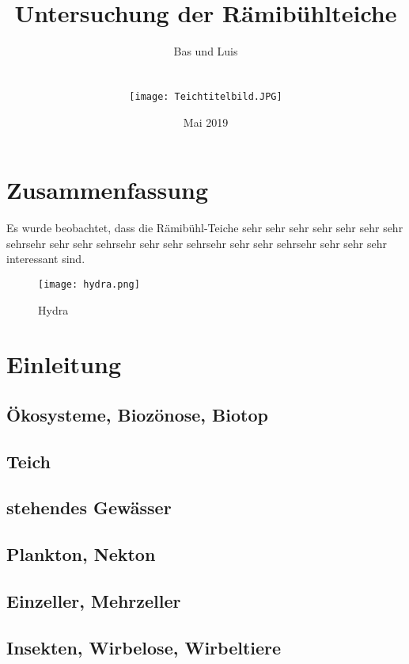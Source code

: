 \documentclass{article}
\title{\Huge{Untersuchung der Rämibühlteiche}}
\author{ \huge{Bas und Luis} \\ \\ \\
         \texttt{[image: Teichtitelbild.JPG]}}
\date{Mai 2019}
\begin{document}
\maketitle

\newpage


\centering \section{Zusammenfassung}
Es wurde beobachtet, dass die Rämibühl-Teiche sehr sehr sehr sehr sehr sehr sehr sehrsehr sehr sehr sehrsehr sehr sehr sehrsehr sehr sehr sehrsehr sehr sehr sehr interessant sind.

\begin{figure}[h!]
\centering
\texttt{[image: hydra.png]}
\caption{Hydra}
\label{fig:universe}
\end{figure}

\section{Einleitung}

    \subsection{Ökosysteme, Biozönose, Biotop}
    
    \subsection{Teich}
    
    \subsection{stehendes Gewässer}
    
    \subsection{Plankton, Nekton}
    
    \subsection{Einzeller, Mehrzeller}
    
    \subsection{Insekten, Wirbelose, Wirbeltiere}
    
\end{document}
